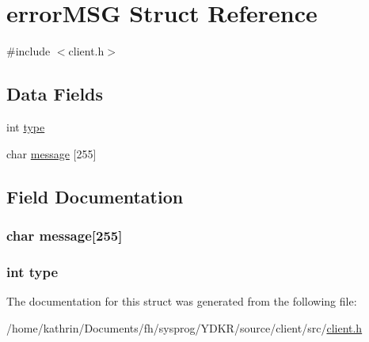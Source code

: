 \hypertarget{structerror_m_s_g}{
\section{errorMSG Struct Reference}
\label{structerror_m_s_g}
}


{\ttfamily \#include $<$client.h$>$}

\subsection*{Data Fields}
\begin{DoxyCompactItemize}
\item 
int \hyperlink{structerror_m_s_g_ac765329451135abec74c45e1897abf26}{type}
\item 
char \hyperlink{structerror_m_s_g_a2e6c6938441b2afa2c4ecd06c563a3f7}{message} \mbox{[}255\mbox{]}
\end{DoxyCompactItemize}


\subsection{Field Documentation}
\hypertarget{structerror_m_s_g_a2e6c6938441b2afa2c4ecd06c563a3f7}{
\subsubsection[{message}]{\setlength{\rightskip}{0pt plus 5cm}char {\bf message}\mbox{[}255\mbox{]}}}
\label{structerror_m_s_g_a2e6c6938441b2afa2c4ecd06c563a3f7}
\hypertarget{structerror_m_s_g_ac765329451135abec74c45e1897abf26}{
\subsubsection[{type}]{\setlength{\rightskip}{0pt plus 5cm}int {\bf type}}}
\label{structerror_m_s_g_ac765329451135abec74c45e1897abf26}


The documentation for this struct was generated from the following file:\begin{DoxyCompactItemize}
\item 
/home/kathrin/Documents/fh/sysprog/YDKR/source/client/src/\hyperlink{client_2src_2client_8h}{client.h}\end{DoxyCompactItemize}
